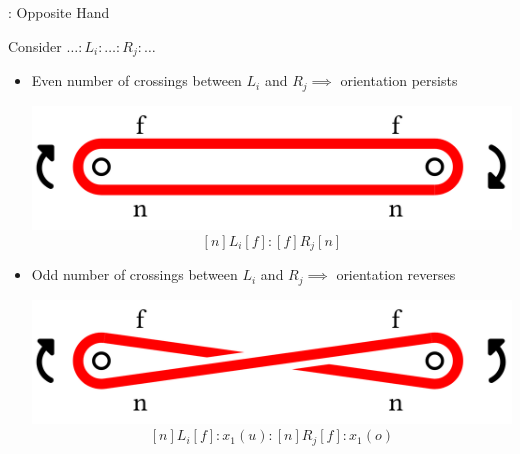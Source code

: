\begin{frame}{\subsecname: Opposite Hand}
\begin{adjustwidth}{-1.5em}{-1.5em}
Consider $\ldots:L_i:\ldots:R_j:\ldots$
\begin{itemize}[<+(1)->]
    \item Even number of crossings between $L_i$ and $R_j\implies$ orientation persists\\
    \begin{center}
    \includegraphics[width=0.5\columnwidth]{figures/diff-even.png}
    $$
    [n]L_i[f]:[f]R_j[n]
    $$
    \end{center}
    \item Odd number of crossings between $L_i$ and $R_j\implies$ orientation reverses\\
    \begin{center}
    \includegraphics[width=0.5\columnwidth]{figures/diff-odd.png}
    $$
    [n]L_i[f]:x_1(u):[n]R_j[f]:x_1(o)
    $$
    \end{center}
\end{itemize}
\end{adjustwidth}
\end{frame}

